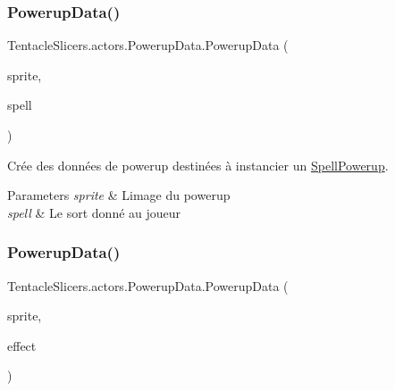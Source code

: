 \subsubsection{\texorpdfstring{Powerup\+Data()}{PowerupData()}\hspace{0.1cm}{\footnotesize\ttfamily [1/2]}}
{\footnotesize\ttfamily Tentacle\+Slicers.\+actors.\+Powerup\+Data.\+Powerup\+Data (\begin{DoxyParamCaption}\item[{\hyperlink{class_tentacle_slicers_1_1graphics_1_1_custom_sprite}{Custom\+Sprite}}]{sprite,  }\item[{\hyperlink{class_tentacle_slicers_1_1spells_1_1_spell_data}{Spell\+Data}}]{spell }\end{DoxyParamCaption})}



Crée des données de powerup destinées à instancier un \hyperlink{class_tentacle_slicers_1_1actors_1_1_spell_powerup}{Spell\+Powerup}. 


\begin{DoxyParams}{Parameters}
{\em sprite} & L\textquotesingle{}image du powerup \\
\hline
{\em spell} & Le sort donné au joueur \\
\hline
\end{DoxyParams}
\mbox{\label{class_tentacle_slicers_1_1actors_1_1_powerup_data_ad2e38db9e1280b5cc7730111be944e5e}} 
\subsubsection{\texorpdfstring{Powerup\+Data()}{PowerupData()}\hspace{0.1cm}{\footnotesize\ttfamily [2/2]}}
{\footnotesize\ttfamily Tentacle\+Slicers.\+actors.\+Powerup\+Data.\+Powerup\+Data (\begin{DoxyParamCaption}\item[{\hyperlink{class_tentacle_slicers_1_1graphics_1_1_custom_sprite}{Custom\+Sprite}}]{sprite,  }\item[{Action$<$ \hyperlink{class_tentacle_slicers_1_1actors_1_1_player_character}{Player\+Character} $>$}]{effect }\end{DoxyParamCaption})}



